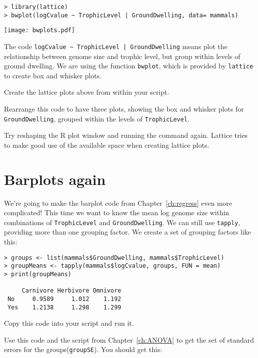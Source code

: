 \begin{lstlisting}
> library(lattice)
> bwplot(logCvalue ~ TrophicLevel | GroundDwelling, data= mammals)
\end{lstlisting}

\begin{center}
	\texttt{[image: bwplots.pdf]}
\end{center}
	
The code {\tt logCvalue \textasciitilde{} TrophicLevel | 
GroundDwelling} means plot the relationship between genome size and 
trophic level, but group within levels of ground dwelling. We are using 
the function {\tt bwplot}, which is provided by {\tt lattice} to create 
box and whisker plots. 

\begin{compactitem}[$\quad\star$]
	\item Create the lattice plots above from within your script.
	\item Rearrange this code to have three plots, showing the box and 
	whisker plots for {\tt GroundDwelling}, grouped within the levels of 
	{\tt TrophicLevel}.
	\item Try reshaping the R plot window and running the command again. 
	Lattice tries to make good use of the available space when creating 
	lattice plots.
\end{compactitem}

\section{Barplots again}

We're going to make the barplot code from Chapter~\ref{ch:regress} even more 
complicated! This time we want to know the mean log genome size within 
combinations of {\tt TrophicLevel} and {\tt GroundDwelling}. We can 
still use {\tt tapply}, providing more than one grouping factor. We 
create a set of grouping factors like this:


\begin{lstlisting}
> groups <- list(mammals$GroundDwelling, mammals$TrophicLevel)
> groupMeans <- tapply(mammals$logCvalue, groups, FUN = mean)
> print(groupMeans)

     Carnivore Herbivore Omnivore
 No     0.9589     1.012    1.192
 Yes    1.2138     1.298    1.299
\end{lstlisting}

\begin{compactitem}[$\quad\star$]
	\item Copy this code into your script and run it.
	\item Use this code and the script from Chapter~\ref{ch:ANOVA} to get the set of 
	standard errors for the groups({\tt groupSE}). You should get this: 
\end{compactitem}

